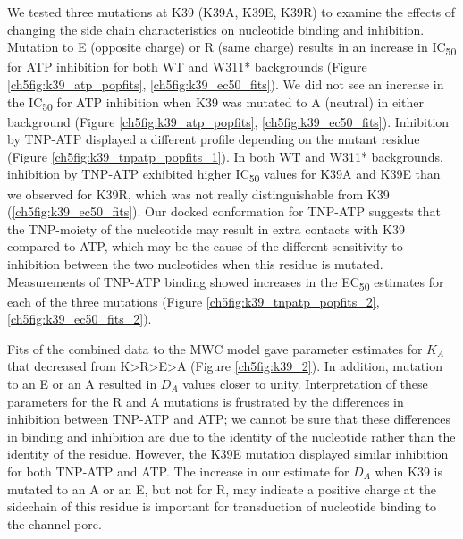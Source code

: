 We tested three mutations at K39 (K39A, K39E, K39R) to examine the effects of changing the side chain characteristics on nucleotide binding and inhibition.
Mutation to E (opposite charge) or R (same charge) results in an increase in IC\textsubscript{50} for ATP inhibition for both WT and W311* backgrounds (Figure \ref{ch5fig:k39_atp_popfits}, \ref{ch5fig:k39_ec50_fits}).
We did not see an increase in the IC\textsubscript{50} for ATP inhibition when K39 was mutated to A (neutral) in either background (Figure \ref{ch5fig:k39_atp_popfits}, \ref{ch5fig:k39_ec50_fits}).
Inhibition by TNP-ATP displayed a different profile depending on the mutant residue (Figure \ref{ch5fig:k39_tnpatp_popfits_1}).
In both WT and W311* backgrounds, inhibition by TNP-ATP exhibited higher IC\textsubscript{50} values for K39A and K39E than we observed for K39R, which was not really distinguishable from K39 (\ref{ch5fig:k39_ec50_fits}).
Our docked conformation for TNP-ATP suggests that the TNP-moiety of the nucleotide may result in extra contacts with K39 compared to ATP, which may be the cause of the different sensitivity to inhibition between the two nucleotides when this residue is mutated.
Measurements of TNP-ATP binding showed increases in the EC\textsubscript{50} estimates for each of the three mutations (Figure \ref{ch5fig:k39_tnpatp_popfits_2}, \ref{ch5fig:k39_ec50_fits_2}).

Fits of the combined data to the MWC model gave parameter estimates for $K_A$ that decreased from K>R>E>A (Figure \ref{ch5fig:k39_2}).
In addition, mutation to an E or an A resulted in $D_A$ values closer to unity.
Interpretation of these parameters for the R and A mutations is frustrated by the differences in inhibition between TNP-ATP and ATP; we cannot be sure that these differences in binding and inhibition are due to the identity of the nucleotide rather than the identity of the residue.
However, the K39E mutation displayed similar inhibition for both TNP-ATP and ATP.
The increase in our estimate for $D_A$ when K39 is mutated to an A or an E, but not for R, may indicate a positive charge at the sidechain of this residue is important for transduction of nucleotide binding to the channel pore.

